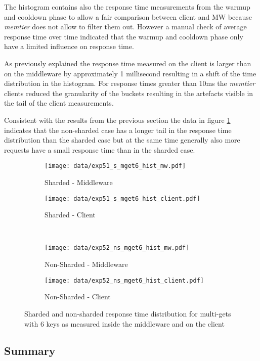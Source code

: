 \documentclass[report.tex]{subfiles}
\begin{document}
The histogram contains also the response time measurements from the warmup and cooldown phase to allow a fair comparison between client and MW because \emph{memtier} does not allow to filter them out. However a manual check of average response time over time indicated that the warmup and cooldown phase only have a limited influence on response time.

As previously explained the response time measured on the client is larger than on the middleware by approximately 1 millisecond resulting in a shift of the time distribution in the histogram.
For response times greater than 10ms the \emph{memtier} clients reduced the granularity of the buckets resulting in the artefacts visible in the tail of the client measurements.

Consistent with the results from the previous section the data in figure \ref{exp5_hist} indicates that the non-sharded case has a longer tail in the response time distribution than the sharded case but at the same time generally also more requests have a small response time than in the sharded case.

\begin{figure}
	\begin{subfigure}[b]{.49\linewidth}
		\centering
		\texttt{[image: data/exp51\_s\_mget6\_hist\_mw.pdf]}
		\caption{Sharded - Middleware}
	\end{subfigure}\hfill
	\begin{subfigure}[b]{.49\linewidth}
		\centering
		\texttt{[image: data/exp51\_s\_mget6\_hist\_client.pdf]}
		\caption{Sharded - Client}
	\end{subfigure} \\
	\begin{subfigure}[b]{.49\linewidth}
		\centering
		\texttt{[image: data/exp52\_ns\_mget6\_hist\_mw.pdf]}
		\caption{Non-Sharded - Middleware}
	\end{subfigure}\hfill
	\begin{subfigure}[b]{.49\linewidth}
		\centering
		\texttt{[image: data/exp52\_ns\_mget6\_hist\_client.pdf]}
		\caption{Non-Sharded - Client}
	\end{subfigure}%
	\caption{Sharded and non-sharded response time distribution for multi-gets with 6 keys as measured inside the middleware and on the client}\label{exp5_hist}
\end{figure}

\subsection{Summary}
\end{document}
